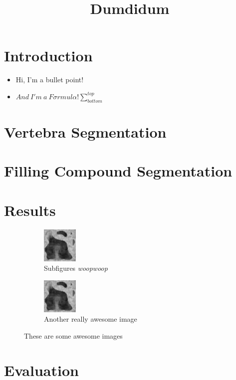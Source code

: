 \documentclass{article}
\title{Dumdidum}
\begin{document}
  
  \maketitle
  
  \section{Introduction}
  
  \begin{itemize}
    \item Hi, I'm a bullet point!
    \item $And~ I'm~ a~ F{\sigma}rmul{\alpha}! \sum_{bottom}^{top}$
  \end{itemize}
  {
    }
  
  \section{Vertebra Segmentation}
  
  \section{Filling Compound Segmentation}
  
  \section{Results}
  \begin{figure}[h]
          \centering
    \begin{subfigure}[t]{0.45\linewidth}
      \centering
      \includegraphics{test.png}
      \caption{Subfigures \textit{woopwoop}}
    \end{subfigure}
    \hfill
    \begin{subfigure}[t]{0.45\linewidth}
      \centering
      \includegraphics{test.png}
      \caption{Another really awesome image}
    \end{subfigure}
    \caption{These are some awesome images}
  \end{figure}
  
  \section{Evaluation}
\end{document}
